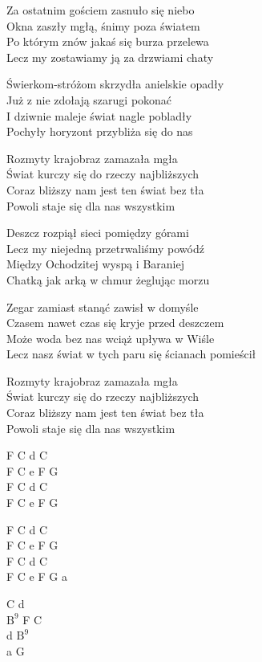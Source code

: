 \begin{text}
Za ostatnim gościem zasnuło się niebo\\
Okna zaszły mgłą, śnimy poza światem\\
Po którym znów jakaś się burza przelewa\\
Lecz my zostawiamy ją za drzwiami chaty

Świerkom-stróżom skrzydła anielskie opadły\\
Już z nie zdołają szarugi pokonać\\
I dziwnie maleje świat nagle pobladły\\
Pochyły horyzont przybliża się do nas

\vin Rozmyty krajobraz zamazała mgła\\
\vin Świat kurczy się do rzeczy najbliższych\\
\vin Coraz bliższy nam jest ten świat bez tła\\
\vin Powoli staje się dla nas wszystkim

Deszcz rozpiął sieci pomiędzy górami\\
Lecz my niejedną przetrwaliśmy powódź\\
Między Ochodzitej wyspą i Baraniej\\
Chatką jak arką w chmur żeglując morzu

Zegar zamiast stanąć zawisł w domyśle\\
Czasem nawet czas się kryje przed deszczem\\
Może woda bez nas wciąż upływa w Wiśle\\
Lecz nasz świat w tych paru się ścianach pomieścił

\vin Rozmyty krajobraz zamazała mgła\\
\vin Świat kurczy się do rzeczy najbliższych\\
\vin Coraz bliższy nam jest ten świat bez tła\\
\vin Powoli staje się dla nas wszystkim
\end{text}
\begin{chord}
    F C d C\\
    F C e F G\\
    F C d C\\
    F C e F G

    F C d C\\
    F C e F G\\
    F C d C\\
    F C e F G a

    C d\\
    $\mathrm{B^9}$ F C\\
    d $\mathrm{B^9}$\\
    a G
\end{chord}
